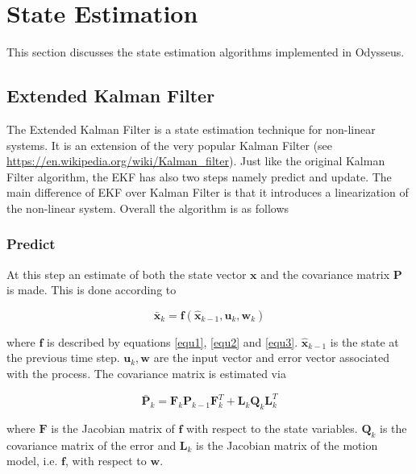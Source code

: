 \section{State Estimation}
\label{state_estimation}

This section discusses the state estimation algorithms 
implemented in Odysseus. 

\subsection{Extended Kalman Filter}
\label{extended_kalman_filter}
The Extended Kalman Filter is a state estimation technique for non-linear systems. 
It is an extension of the very popular Kalman Filter (see \url{https://en.wikipedia.org/wiki/Kalman_filter}).
Just like the original Kalman Filter algorithm, the EKF has also two steps namely predict and update. 
The main difference of EKF over Kalman Filter is that it introduces a linearization of the non-linear system. 
Overall the algorithm is as follows

\subsubsection{Predict}

At this step an estimate of both the state vector $\mathbf{x}$ and the covariance matrix $\mathbf{P}$ is made.
This is done according to

\begin{equation}
\bar{\mathbf{x}}_k = \mathbf{f}(\hat{\mathbf{x}}_{k-1}, \mathbf{u}_k, \mathbf{w}_k)
\end{equation}

where $\mathbf{f}$ is described by equations \ref{equ1},  \ref{equ2} and \ref{equ3}. $\hat{\mathbf{x}}_{k-1}$ is the state at the previous
time step. $\mathbf{u}_k, \mathbf{w}$ are the input vector and error vector associated with the process. The covariance matrix is estimated via 

\begin{equation}
\bar{\mathbf{P}}_k = \mathbf{F}_k \mathbf{P}_{k-1} \mathbf{F}_{k}^T + \mathbf{L}_k\mathbf{Q}_k\mathbf{L}_{k}^T
\end{equation}

where $\mathbf{F}$ is the Jacobian matrix of $\mathbf{f}$ with respect to the state variables. 
$\mathbf{Q}_k$ is the covariance matrix of the error and $\mathbf{L}_k$ is the Jacobian matrix of the motion
model, i.e. $\mathbf{f}$, with respect to $\mathbf{w}$.

